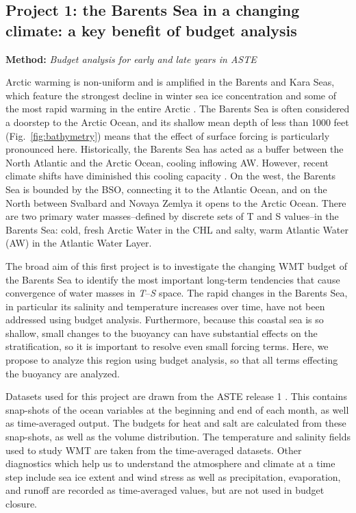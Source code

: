 \documentclass[a4paper,12pt]{article}
\begin{document}
    \subsection{Project 1: the Barents Sea in a changing climate: a key benefit of budget analysis}
    
    \begin{tcolorbox}[minipage,colback=Goldenrod,arc=10pt,outer arc=10pt]
    \centering
    \textbf{Method:}	\emph{Budget analysis for early and late years in ASTE}\label{sec1_1}
    \end{tcolorbox}

    Arctic warming is non-uniform and is amplified in the Barents and Kara Seas, which feature the strongest decline in winter sea ice concentration and some of the most rapid warming in the entire Arctic \cite{Screen2010,Cosimo2014}. The Barents Sea is often considered a doorstep to the Arctic Ocean, and its shallow mean depth of less than 1000 feet (Fig.~\ref{fig:bathymetry}) means that the effect of surface forcing is particularly pronounced here. Historically, the Barents Sea has acted as a buffer between the North Atlantic and the Arctic Ocean, cooling inflowing AW. However, recent climate shifts have diminished this cooling capacity \cite{Lind2018}. On the west, the Barents Sea is bounded by the BSO, connecting it to the Atlantic Ocean, and on the North between Svalbard and Novaya Zemlya it opens to the Arctic Ocean. There are two primary water masses--defined by discrete sets of T and S values--in the Barents Sea: cold, fresh Arctic Water in the CHL and salty, warm Atlantic Water (AW) in the Atlantic Water Layer. 
    
    The broad aim of this first project is to investigate the changing WMT budget of the Barents Sea to identify the most important long-term tendencies that cause convergence of water masses in \emph{T}--\emph{S} space. The rapid changes in the Barents Sea, in particular its salinity and temperature increases over time, have not been addressed using budget analysis. Furthermore, because this coastal sea is so shallow, small changes to the buoyancy can have substantial effects on the stratification, so it is important to resolve even small forcing terms. Here, we propose to analyze this region using budget analysis, so that all terms effecting the buoyancy are analyzed.

    Datasets used for this project are drawn from the ASTE release 1 \cite{Nguyen2021}. This contains snap-shots of the ocean variables at the beginning and end of each month, as well as time-averaged output. The budgets for heat and salt are calculated from these snap-shots, as well as the volume distribution. The temperature and salinity fields used to study WMT are taken from the time-averaged datasets. Other diagnostics which help us to understand the atmosphere and climate at a time step include sea ice extent and wind stress as well as precipitation, evaporation, and runoff are recorded as time-averaged values, but are not used in budget closure.
\end{document}
